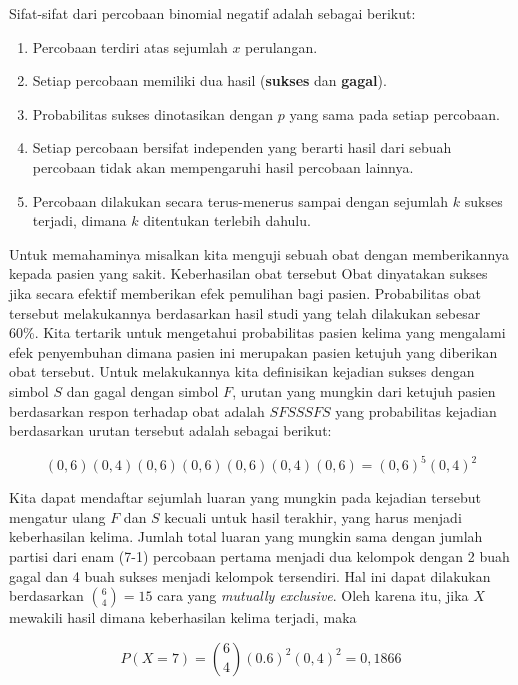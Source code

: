 \documentclass[]{book}
\providecommand{\tightlist}{%
  \setlength{\itemsep}{0pt}\setlength{\parskip}{0pt}}
\begin{document}
Sifat-sifat dari percobaan binomial negatif adalah sebagai berikut:

\begin{enumerate}
\def\labelenumi{\arabic{enumi}.}
\tightlist
\item
  Percobaan terdiri atas sejumlah \(x\) perulangan.
\item
  Setiap percobaan memiliki dua hasil (\textbf{sukses} dan
  \textbf{gagal}).
\item
  Probabilitas sukses dinotasikan dengan \(p\) yang sama pada setiap
  percobaan.
\item
  Setiap percobaan bersifat independen yang berarti hasil dari sebuah
  percobaan tidak akan mempengaruhi hasil percobaan lainnya.
\item
  Percobaan dilakukan secara terus-menerus sampai dengan sejumlah \(k\)
  sukses terjadi, dimana \(k\) ditentukan terlebih dahulu.
\end{enumerate}

Untuk memahaminya misalkan kita menguji sebuah obat dengan memberikannya
kepada pasien yang sakit. Keberhasilan obat tersebut Obat dinyatakan
sukses jika secara efektif memberikan efek pemulihan bagi pasien.
Probabilitas obat tersebut melakukannya berdasarkan hasil studi yang
telah dilakukan sebesar 60\%. Kita tertarik untuk mengetahui
probabilitas pasien kelima yang mengalami efek penyembuhan dimana pasien
ini merupakan pasien ketujuh yang diberikan obat tersebut. Untuk
melakukannya kita definisikan kejadian sukses dengan simbol \(S\) dan
gagal dengan simbol \(F\), urutan yang mungkin dari ketujuh pasien
berdasarkan respon terhadap obat adalah \(SFSSSFS\) yang probabilitas
kejadian berdasarkan urutan tersebut adalah sebagai berikut:

\[
\left(0,6\right)\left(0,4\right)\left(0,6\right)\left(0,6\right)\left(0,6\right)\left(0,4\right)\left(0,6\right)=\left(0,6\right)^5\left(0,4\right)^2
\]

Kita dapat mendaftar sejumlah luaran yang mungkin pada kejadian tersebut
mengatur ulang \(F\) dan \(S\) kecuali untuk hasil terakhir, yang harus
menjadi keberhasilan kelima. Jumlah total luaran yang mungkin sama
dengan jumlah partisi dari enam (7-1) percobaan pertama menjadi dua
kelompok dengan 2 buah gagal dan 4 buah sukses menjadi kelompok
tersendiri. Hal ini dapat dilakukan berdasarkan \(\binom{6}{4}=15\) cara
yang \emph{mutually exclusive}. Oleh karena itu, jika \(X\) mewakili
hasil dimana keberhasilan kelima terjadi, maka

\[
P\left(X=7\right)=\binom{6}{4}\left(0.6\right)^2\left(0,4\right)^2=0,1866
\]
\end{document}
